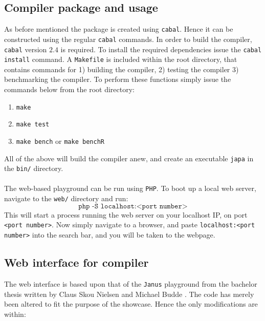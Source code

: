 \subsection{Compiler package and usage }
As before mentioned the \lan package is created using \texttt{cabal}. Hence it can be constructed
using the regular \texttt{cabal} commands.
In order to build the compiler, \texttt{cabal} version $2.4$ is required. To install the
required dependencies issue the \texttt{cabal install} command.
A \texttt{Makefile} is included within
the root directory, that contains commands for 1) building the compiler, 2) testing the compiler
3) benchmarking the compiler. To perform these functions simply issue the commands below from
the root directory:
\begin{enumerate}
    \item \texttt{make}
    \item \texttt{make test}
    \item \texttt{make bench} or \texttt{make benchR}
\end{enumerate}
\noindent
All of the above will build the compiler anew, and create an executable \texttt{japa} in the
\texttt{bin/} directory.
\\
\\
The web-based \lan playground can be run using \texttt{PHP}. To boot up a local web server,
navigate to the \texttt{web/} directory and run:
$$\texttt{php -S localhost:<port number>}$$
\noindent
This will start a process running the web server on your localhost IP, on port \texttt{<port number>}.
Now simply navigate to a browser, and paste \texttt{localhost:<port number>} into the search bar,
and you will be taken to the webpage.

\subsection{Web interface for compiler }
The web interface is based upon that of the \texttt{Janus} playground \cite{janusInterp} from
the bachelor thesis written by Claus Skou Nielsen and Michael Budde \cite{janusPlayground}.
The code has merely been altered to fit the purpose of the \lan showcase. Hence the only
modifications are within:

